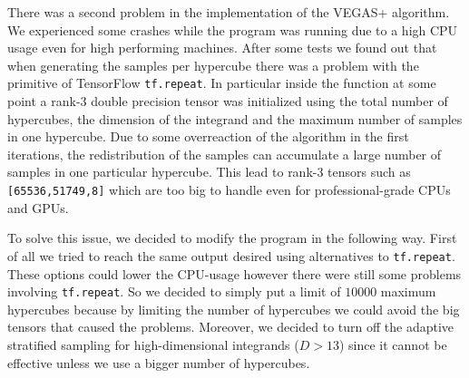 \documentclass[../main/main.tex]{subfiles}
\begin{document}
There was a second problem in the implementation of the VEGAS+ algorithm.
We experienced some crashes while the program was running due to a high CPU usage even for high performing machines. After some tests we found out that when generating the samples per hypercube there was a problem with the primitive of TensorFlow \texttt{tf.repeat}. In particular inside the function at some point a rank-3 double precision tensor was initialized using the total number of hypercubes, the dimension of the integrand and the maximum number of samples in one hypercube. Due to some overreaction of the algorithm in the first iterations, the redistribution of the samples can accumulate a large number of samples in one particular hypercube. This lead to rank-3 tensors such as \texttt{[65536,51749,8]} which are too big to handle even for professional-grade CPUs and GPUs.

To solve this issue, we decided to modify the program in the following way.
First of all we tried to reach the same output desired using alternatives to \texttt{tf.repeat}. These options could lower the CPU-usage however there were still some problems involving \texttt{tf.repeat}. So we decided to simply put a limit of $10000$ maximum hypercubes because by limiting the number of hypercubes we could avoid the big tensors that caused the problems.
Moreover,  we decided to turn off the adaptive stratified sampling for high-dimensional integrands ($D > 13$) since it cannot be effective unless we use a bigger number of hypercubes.
\end{document}
